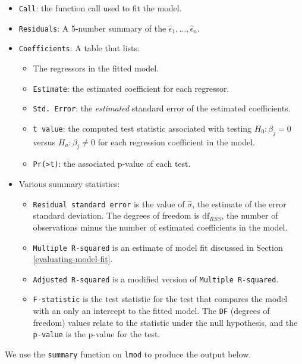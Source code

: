 \documentclass[
]{book}
\providecommand{\tightlist}{%
  \setlength{\itemsep}{0pt}\setlength{\parskip}{0pt}}
\theoremstyle{definition}
\theoremstyle{definition}
\theoremstyle{definition}
\theoremstyle{definition}
\theoremstyle{remark}
\begin{document}
\begin{itemize}
\tightlist
\item
  \texttt{Call}: the function call used to fit the model.
\item
  \texttt{Residuals}: A 5-number summary of the \(\hat{\epsilon}_1, \ldots, \hat{\epsilon}_n\).
\item
  \texttt{Coefficients}: A table that lists:

  \begin{itemize}
  \tightlist
  \item
    The regressors in the fitted model.
  \item
    \texttt{Estimate}: the estimated coefficient for each regressor.
  \item
    \texttt{Std.\ Error}: the \emph{estimated} standard error of the estimated coefficients.
  \item
    \texttt{t\ value}: the computed test statistic associated with testing \(H_0: \beta_j = 0\) versus \(H_a: \beta_j \neq 0\) for each regression coefficient in the model.
  \item
    \texttt{Pr(\textgreater{}\textbar{}t\textbar{})}: the associated p-value of each test.
  \end{itemize}
\item
  Various summary statistics:

  \begin{itemize}
  \tightlist
  \item
    \texttt{Residual\ standard\ error} is the value of \(\hat{\sigma}\), the estimate of the error standard deviation. The degrees of freedom is \(\mathrm{df}_{RSS}\), the number of observations minus the number of estimated coefficients in the model.
  \item
    \texttt{Multiple\ R-squared} is an estimate of model fit discussed in Section \ref{evaluating-model-fit}.
  \item
    \texttt{Adjusted\ R-squared} is a modified version of \texttt{Multiple\ R-squared}.
  \item
    \texttt{F-statistic} is the test statistic for the test that compares the model with an only an intercept to the fitted model. The \texttt{DF} (degrees of freedom) values relate to the statistic under the null hypothesis, and the \texttt{p-value} is the p-value for the test.
  \end{itemize}
\end{itemize}

We use the \texttt{summary} function on \texttt{lmod} to produce the output below.
\end{document}
